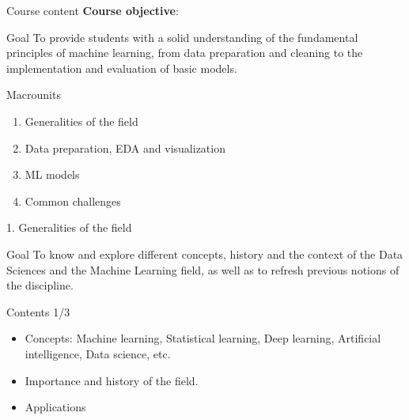\documentclass[
  ignorenonframetext,
]{beamer}
\providecommand{\tightlist}{%
  \setlength{\itemsep}{0pt}\setlength{\parskip}{0pt}}\usepackage{longtable,booktabs,array}
\begin{document}
\begin{frame}{Course content}
\protect\hypertarget{course-content}{}
\textbf{Course objective}:

\begin{alertblock}{Goal}
\protect\hypertarget{goal}{}
To provide students with a solid understanding of the fundamental
principles of machine learning, from data preparation and cleaning to
the implementation and evaluation of basic models.

\pause
\end{alertblock}

\begin{exampleblock}{Macrounits}
\protect\hypertarget{macrounits}{}
\begin{enumerate}
\tightlist
\item
  Generalities of the field
\item
  Data preparation, EDA and visualization
\item
  ML models
\item
  Common challenges
\end{enumerate}
\end{exampleblock}
\end{frame}

\begin{frame}{1. Generalities of the field}
\protect\hypertarget{generalities-of-the-field}{}
\begin{alertblock}{Goal}
\protect\hypertarget{goal-1}{}
To know and explore different concepts, history and the context of the
Data Sciences and the Machine Learning field, as well as to refresh
previous notions of the discipline.

\pause
\end{alertblock}

\begin{exampleblock}{Contents 1/3}
\protect\hypertarget{contents-13}{}
\begin{itemize}
\tightlist
\item
  Concepts: Machine learning, Statistical learning, Deep learning,
  Artificial intelligence, Data science, etc.
\item
  Importance and history of the field.
\item
  Applications
\end{itemize}
\end{exampleblock}
\end{frame}
\end{document}
